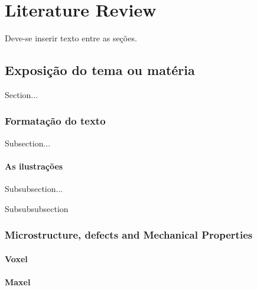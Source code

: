 \chapter{Literature Review}\label{cap:literatureReview}
Deve-se inserir texto entre as seções.

\section{Exposição do tema ou matéria}

Section...

\subsection{Formatação do texto}

Subsection...

\subsubsection{As ilustrações}

Subsubsection...


Subsubsubsection


\subsection{Microstructure, defects and Mechanical Properties}

\subsubsection{Voxel}



\subsubsection{Maxel}


